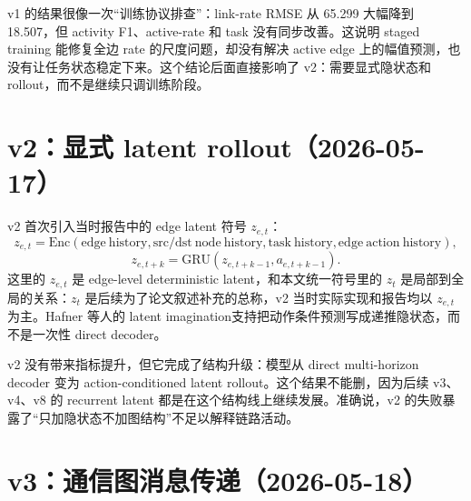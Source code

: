 \documentclass[UTF8,a4paper,11pt]{ctexart}
\newcommand{\code}[1]{\texttt{#1}}
\begin{document}
v1 的结果很像一次“训练协议排查”：link-rate RMSE 从 65.299 大幅降到 18.507，但 activity F1、active-rate 和 task 没有同步改善。这说明 staged training 能修复全边 rate 的尺度问题，却没有解决 active edge 上的幅值预测，也没有让任务状态稳定下来。这个结论后面直接影响了 v2：需要显式隐状态和 rollout，而不是继续只调训练阶段。

\section{v2：显式 latent rollout（2026-05-17）}

v2 首次引入当时报告中的 edge latent 符号 $z_{e,t}$：
\[
z_{e,t}=\mathrm{Enc}(\mathrm{edge\ history},\mathrm{src/dst\ node\ history},\mathrm{task\ history},\mathrm{edge\ action\ history}),
\]
\[
z_{e,t+k}=\mathrm{GRU}(z_{e,t+k-1},a_{e,t+k-1}).
\]
这里的 $z_{e,t}$ 是 edge-level deterministic latent，和本文统一符号里的 $z_t$ 是局部到全局的关系：$z_t$ 是后续为了论文叙述补充的总称，v2 当时实际实现和报告均以 $z_{e,t}$ 为主。Hafner 等人的 latent imagination支持把动作条件预测写成递推隐状态，而不是一次性 direct decoder。

\begin{table}[H]
\centering
\small
{}
\caption{v2 latent rollout 与 v0/v1 的 test seed 4 对比，来源为 \code{world\_model\_v2\_latent\_rollout\_report.md}。}
\end{table}

v2 没有带来指标提升，但它完成了结构升级：模型从 direct multi-horizon decoder 变为 action-conditioned latent rollout。这个结果不能删，因为后续 v3、v4、v8 的 recurrent latent 都是在这个结构线上继续发展。准确说，v2 的失败暴露了“只加隐状态不加图结构”不足以解释链路活动。

\section{v3：通信图消息传递（2026-05-18）}
\end{document}
